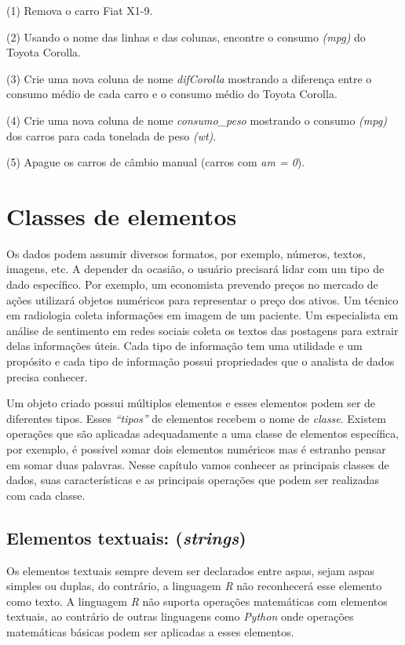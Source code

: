 \documentclass[
  letterpaper,
  DIV=11,
  numbers=noendperiod]{scrreprt}
\begin{document}
(1) Remova o carro Fiat X1-9.

(2) Usando o nome das linhas e das colunas, encontre o consumo
\emph{(mpg)} do Toyota Corolla.

(3) Crie uma nova coluna de nome \emph{difCorolla} mostrando a diferença
entre o consumo médio de cada carro e o consumo médio do Toyota Corolla.

(4) Crie uma nova coluna de nome \emph{consumo\_peso} mostrando o
consumo \emph{(mpg)} dos carros para cada tonelada de peso \emph{(wt)}.

(5) Apague os carros de câmbio manual (carros com \emph{am = 0}).


\chapter{Classes de elementos}\label{classes-de-elementos}

Os dados podem assumir diversos formatos, por exemplo, números, textos,
imagens, etc. A depender da ocasião, o usuário precisará lidar com um
tipo de dado específico. Por exemplo, um economista prevendo preços no
mercado de ações utilizará objetos numéricos para representar o preço
dos ativos. Um técnico em radiologia coleta informações em imagem de um
paciente. Um especialista em análise de sentimento em redes sociais
coleta os textos das postagens para extrair delas informações úteis.
Cada tipo de informação tem uma utilidade e um propósito e cada tipo de
informação possui propriedades que o analista de dados precisa conhecer.

Um objeto criado possui múltiplos elementos e esses elementos podem ser
de diferentes tipos. Esses \emph{``tipos''} de elementos recebem o nome
de \emph{classe}. Existem operações que são aplicadas adequadamente a
uma classe de elementos específica, por exemplo, é possível somar dois
elementos numéricos mas é estranho pensar em somar duas palavras. Nesse
capítulo vamos conhecer as principais classes de dados, suas
características e as principais operações que podem ser realizadas com
cada classe.

\section{\texorpdfstring{Elementos textuais:
(\emph{strings})}{Elementos textuais: (strings)}}\label{elementos-textuais-strings}

Os elementos textuais sempre devem ser declarados entre aspas, sejam
aspas simples ou duplas, do contrário, a linguagem \emph{R} não
reconhecerá esse elemento como texto. A linguagem \emph{R} não suporta
operações matemáticas com elementos textuais, ao contrário de outras
linguagens como \emph{Python} onde operações matemáticas básicas podem
ser aplicadas a esses elementos.
\end{document}
